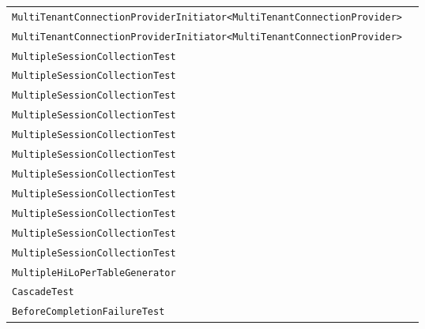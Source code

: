 \begin{center}
\begin{tabular}{ll}
\lstinline/MultiTenantConnectionProviderInitiator<MultiTenantConnectionProvider>/&\raisebox{0pt}{\lstinline/)initiateService(Mapcon)/}\\
\lstinline/MultiTenantConnectionProviderInitiator<MultiTenantConnectionProvider>/&\raisebox{0pt}{\lstinline/initiateService(Mapcon)/}\\
\lstinline/MultipleSessionCollectionTest/&\raisebox{0pt}{\lstinline/testDeleteCopyToNewOwnerInNewSessionBeforeFlush()/}\\
\lstinline/MultipleSessionCollectionTest/&\raisebox{0pt}{\lstinline/testDeleteCopyToNewOwnerNewCollectionRoleInNewSessionBeforeFlush()/}\\
\lstinline/MultipleSessionCollectionTest/&\raisebox{0pt}{\lstinline/testCopyInitializedCollectionReferenceToNewEntityCollectionRoleAfterGet()/}\\
\lstinline/MultipleSessionCollectionTest/&\raisebox{0pt}{\lstinline/testSaveOrUpdateOwnerWithCollectionInNewSessionAfterFlush()/}\\
\lstinline/MultipleSessionCollectionTest/&\raisebox{0pt}{\lstinline/testCopyPersistentCollectionReferenceAfterFlush()/}\\
\lstinline/MultipleSessionCollectionTest/&\raisebox{0pt}{\lstinline/testSaveOrUpdateOwnerWithCollectionInNewSessionBeforeFlush()/}\\
\lstinline/MultipleSessionCollectionTest/&\raisebox{0pt}{\lstinline/testCopyUninitializedCollectionReferenceAfterGet()/}\\
\lstinline/MultipleSessionCollectionTest/&\raisebox{0pt}{\lstinline/testSaveOrUpdateOwnerWithUninitializedCollectionInNewSession()/}\\
\lstinline/MultipleSessionCollectionTest/&\raisebox{0pt}{\lstinline/testCopyPersistentCollectionReferenceBeforeFlush()/}\\
\lstinline/MultipleSessionCollectionTest/&\raisebox{0pt}{\lstinline/testSaveOrUpdateOwnerWithInitializedCollectionInNewSession()/}\\
\lstinline/MultipleSessionCollectionTest/&\raisebox{0pt}{\lstinline/testCopyInitializedCollectionReferenceAfterGet()/}\\
\lstinline/MultipleHiLoPerTableGenerator/&\raisebox{0pt}{\lstinline/IntegralDataTypeHolderexecute(Connection)/}\\
\lstinline/CascadeTest/&\raisebox{0pt}{\lstinline/cleanupData()/}\\
\lstinline/BeforeCompletionFailureTest/&\raisebox{0pt}{\lstinline/testUniqueConstraintViolationDuringManagedFlush()/}\\

\end{tabular}
\end{center}
